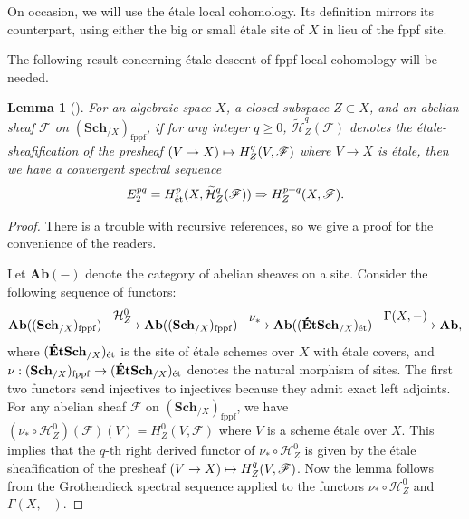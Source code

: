 \documentclass[JEP,XML,SOM,Unicode,published]{cedram}
\newcommand\mto{\mathchoice{\longmapsto}{\mapsto}{\mapsto}{\mapsto}}
\newcommand\To[1]{\mathchoice{\xrightarrow{\textstyle\kern4pt#1\kern3pt}}{\stackrel{#1}{\longrightarrow}}{}{}}
\newcommand{\GG}{\Gamma}
\newcommand{\cH}{\mathcal{H}}
\newcommand{\sF}{\mathscr{F}}
\let\wt\widetilde
\newcommand{\fppf}{\mathrm{fppf}}
\newcommand{\et}{\textup{ét}}
\newcommand{\bpf}{\begin{proof}}
\newcommand{\epf}{\end{proof}}
\newcommand{\blem}{\begin{lemma}}
\newcommand{\elem}{\end{lemma}}
\theoremstyle{plain}
\newtheorem{lemma}[subsection]{Lemma}
\theoremstyle{definition}
\begin{document}
On occasion, we will use the étale local cohomology. Its definition mirrors its counterpart, using either the big or small étale site of $X$ in lieu of the fppf site.

The following result concerning étale descent of fppf local cohomology will be needed.
\blem [{\cf \cite[Lem.\,7.1.1]{CS21}}]\label{et-desent-of-fppf-local}
For an algebraic space $X$, a closed subspace $Z \subset X$, and an abelian sheaf $\sF$ on $(\mathbf{Sch}_{/X})_{\fppf}$, if for any integer $q\ge 0$, $\wt{\cH}^q_Z(\sF)$ denotes the étale-sheafification of the presheaf
$(V\to X)\mto H^q_{Z}(V, \sF)$ where $V\to X$ is étale, then we have a convergent spectral sequence
\[
E_2^{pq}=H_{\et}^p(X,\wt{\cH}^q_Z(\sF))\Rightarrow H^{p+q}_Z(X,\sF).
\]
\elem
\bpf
There is a trouble with recursive references, so we give a proof for the convenience of the readers.

Let \textbf{Ab}$(-)$ denote the category of abelian sheaves on a site. Consider the following sequence of functors:
\[
\textbf{Ab}((\mathbf{Sch}_{/X})_{\fppf})
\To{\cH_Z^0} \textbf{Ab}((\mathbf{Sch}_{/X})_{\fppf})
\To{\nu_*} \textbf{Ab}((\textbf{ÉtSch}_{/X})_{\et})
\To{\GG(X,-)}
\textbf{Ab},
\]
where $(\textbf{ÉtSch}_{/X})_{\et}$ is the site of étale schemes over $X$ with étale covers, and $\nu:(\mathbf{Sch}_{/X})_{\fppf}\to (\textbf{ÉtSch}_{/X})_{\et}$ denotes the natural morphism of sites.
The first two functors {send} injectives to injectives because they admit exact left adjoints. For any abelian sheaf $\sF$ on $(\mathbf{Sch}_{/X})_{\fppf}$, we have $(\nu_*\circ \cH_Z^0)(\sF)(V)=H_Z^0(V,\sF)$ where $V$ is a scheme étale over $X$. This implies that the $q$-th right derived functor of $\nu_*\circ \cH_Z^0$ is given by the étale sheafification of the presheaf $(V\to X)\mto H^q_{Z}(V, \sF)$.
Now the lemma follows from the Grothendieck spectral sequence applied to the functors $\nu_*\circ \cH_Z^0$ and $\GG(X,-)$.
\epf
\end{document}
